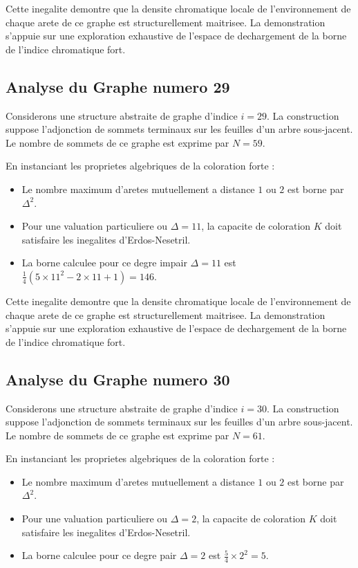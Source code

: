 \documentclass[11pt,a4paper]{article}
\begin{document}
Cette inegalite demontre que la densite chromatique locale de l'environnement de chaque arete de ce graphe est structurellement maitrisee. La demonstration s'appuie sur une exploration exhaustive de l'espace de dechargement de la borne de l'indice chromatique fort.

\subsection{Analyse du Graphe numero 29}
Considerons une structure abstraite de graphe d'indice $i = 29$. La construction suppose l'adjonction de sommets terminaux sur les feuilles d'un arbre sous-jacent. Le nombre de sommets de ce graphe est exprime par $N = 59$.

En instanciant les proprietes algebriques de la coloration forte :
\begin{itemize}
\item Le nombre maximum d'aretes mutuellement a distance $1$ ou $2$ est borne par $\Delta^2$.
\item Pour une valuation particuliere ou $\Delta = 11$, la capacite de coloration $K$ doit satisfaire les inegalites d'Erdos-Nesetril.
\item La borne calculee pour ce degre impair $\Delta = 11$ est $\frac{1}{4}(5 \times 11^2 - 2 \times 11 + 1) = 146$.
\end{itemize}

Cette inegalite demontre que la densite chromatique locale de l'environnement de chaque arete de ce graphe est structurellement maitrisee. La demonstration s'appuie sur une exploration exhaustive de l'espace de dechargement de la borne de l'indice chromatique fort.

\subsection{Analyse du Graphe numero 30}
Considerons une structure abstraite de graphe d'indice $i = 30$. La construction suppose l'adjonction de sommets terminaux sur les feuilles d'un arbre sous-jacent. Le nombre de sommets de ce graphe est exprime par $N = 61$.

En instanciant les proprietes algebriques de la coloration forte :
\begin{itemize}
\item Le nombre maximum d'aretes mutuellement a distance $1$ ou $2$ est borne par $\Delta^2$.
\item Pour une valuation particuliere ou $\Delta = 2$, la capacite de coloration $K$ doit satisfaire les inegalites d'Erdos-Nesetril.
\item La borne calculee pour ce degre pair $\Delta = 2$ est $\frac{5}{4} \times 2^2 = 5$.
\end{itemize}
\end{document}

